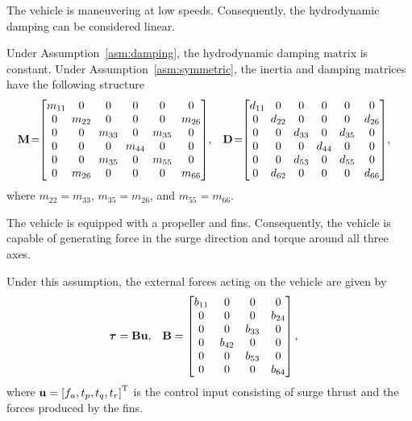 \begin{asm}
    \label{asm:damping}
    The vehicle is maneuvering at low speeds.
    Consequently, the hydrodynamic damping can be considered linear.
\end{asm}

\noindent Under Assumption~\ref{asm:damping}, the hydrodynamic damping matrix is constant.
Under Assumption~\ref{asm:symmetric}, the inertia and damping matrices have the following structure
\begin{align}
    \mat{M}\! &= \!\!
    \begin{bmatrix}
        m_{11}\!\! & 0 & 0 & 0 & 0 & 0\\ 0 & \!m_{22}\! & 0 & 0 & 0 & m_{26}\\ 0 & 0 & \!m_{33}\! & 0 & \!m_{35}\! & 0\\ 0 & 0 & 0 & \!m_{44}\! & 0 & 0\\ 0 & 0 & \!m_{35}\! & 0 & \!m_{55}\! & 0\\ 0 & \!m_{26}\! & 0 & 0 & 0 & m_{66}
    \end{bmatrix}\!, &
    \mat{D}\! &= \!\!
    \begin{bmatrix}
        d_{11}\!\! & 0 & 0 & 0 & 0 & 0\\ 0 & \!d_{22}\! & 0 & 0 & 0 & d_{26}\\ 0 & 0 & \!d_{33}\! & 0 & \!d_{35}\! & 0\\ 0 & 0 & 0 & \!d_{44}\! & 0 & 0\\ 0 & 0 & \!d_{53}\! & 0 & \!d_{55}\! & 0\\ 0 & \!d_{62}\! & 0 & 0 & 0 & d_{66}
    \end{bmatrix}\!,
\end{align}
where $m_{22} = m_{33}$, $m_{35} = m_{26}$, and $m_{55} = m_{66}$.

\begin{asm}
    \label{asm:actuators}
    The vehicle is equipped with a propeller and fins.
    Consequently, the vehicle is capable of generating force in the surge direction and torque around all three axes.
\end{asm}
Under this assumption, the external forces acting on the vehicle are given by
\begin{align}
    \bm{\tau} &= \mathbf{B}\mathbf{u}, &
    \mathbf{B} &= 
    \begin{bmatrix}
        b_{11} & 0 & 0 & 0 \\ 0 & 0 & 0 & b_{24} \\ 0 & 0 & b_{33} & 0 \\ 0 & b_{42} & 0 & 0 \\ 0 & 0 & b_{53} & 0 \\ 0 & 0 & 0 & b_{64}
    \end{bmatrix},
\end{align}
where $\mathbf{u} = \left[f_u, t_p, t_q, t_r\right]^{\mathrm{T}}$ is the control input consisting of surge thrust and the forces produced by the fins.

